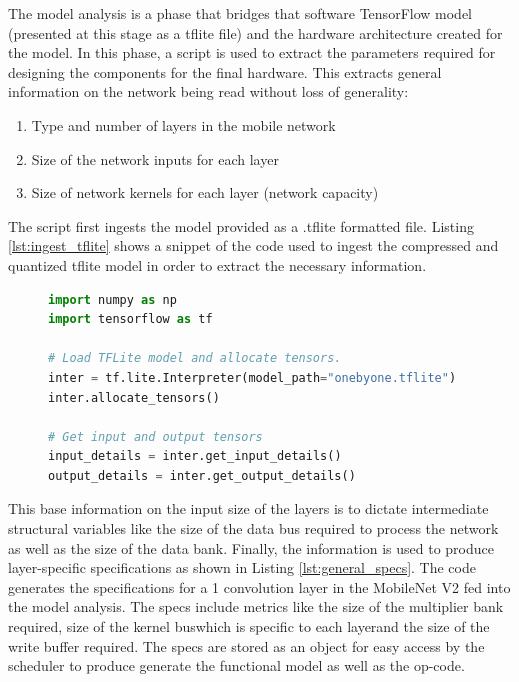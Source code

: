 \documentclass{uw-ece-wkrpt}
\begin{document}
The model analysis is a phase that bridges that software TensorFlow model (presented at this stage as a tflite file) and the hardware architecture created for the model. In this phase, a script is used to extract the parameters required for designing the components for the final hardware. This extracts general information on the network being read without loss of generality:
\begin{enumerate}
\item Type and number of layers in the mobile network
\item Size of the network inputs for each layer
\item Size of network \glspl{kernel} for each layer (network capacity)
\end{enumerate}

The script first ingests the model provided as a .tflite formatted file. Listing \ref{lst:ingest_tflite} shows a snippet of the code used to ingest the compressed and quantized tflite model in order to extract the necessary information.

\begin{figure}
\centering
\begin{lstlisting}[caption={Code for ingesting a .tflite model}, label=lst:ingest_tflite, language=Python]
import numpy as np
import tensorflow as tf

# Load TFLite model and allocate tensors.
inter = tf.lite.Interpreter(model_path="onebyone.tflite")
inter.allocate_tensors()

# Get input and output tensors
input_details = inter.get_input_details()
output_details = inter.get_output_details()
\end{lstlisting}
\end{figure}

This base information on the input size of the layers is to dictate intermediate structural variables like the size of the data bus required to process the network as well as the size of the data bank. Finally, the information is used to produce layer-specific specifications as shown in Listing \ref{lst:general_specs}. The code generates the specifications for a 1  convolution layer in the MobileNet V2 fed into the model analysis. The specs include metrics like the size of the multiplier bank required, size of the \gls{kernel} bus\textemdash{}which is specific to each layer\textemdash{}and the size of the write buffer required. The specs are stored as an object for easy access by the scheduler to produce generate the functional model as well as the op-code.
\end{document}
